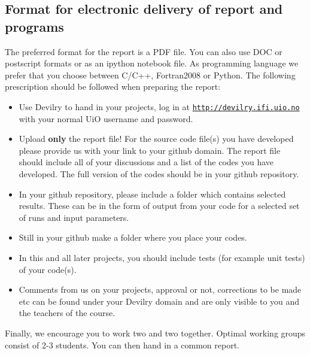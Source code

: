 \documentclass[%
oneside,                 %
final,                   %
10pt]{article}
\begin{document}
\noindent
\subsection*{Format for electronic delivery of report and programs}

The preferred format for the report is a PDF file. You can also use DOC or postscript formats or as an ipython notebook file.  As programming language we prefer that you choose between C/C++, Fortran2008 or Python. The following prescription should be followed when preparing the report:

\begin{itemize}
  \item Use Devilry to hand in your projects, log in  at  \href{{http://devilry.ifi.uio.no}}{\nolinkurl{http://devilry.ifi.uio.no}} with your normal UiO username and password.

  \item Upload \textbf{only} the report file!  For the source code file(s) you have developed please provide us with your link to your github domain.  The report file should include all of your discussions and a list of the codes you have developed.  The full version of the codes should be in your github repository.

  \item In your github repository, please include a folder which contains selected results. These can be in the form of output from your code for a selected set of runs and input parameters.

  \item Still in your github make a folder where you place your codes. 

  \item In this and all later projects, you should include tests (for example unit tests) of your code(s).

  \item Comments  from us on your projects, approval or not, corrections to be made  etc can be found under your Devilry domain and are only visible to you and the teachers of the course.
\end{itemize}

\noindent
Finally, 
we encourage you to work two and two together. Optimal working groups consist of 
2-3 students. You can then hand in a common report. 


\end{document}
